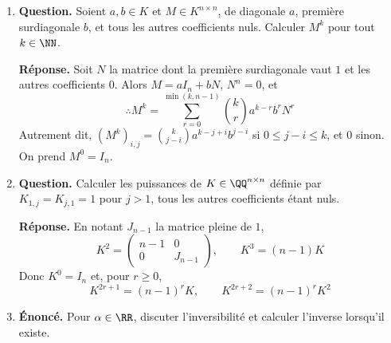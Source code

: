 \documentclass[12pt, a4paper]{article}
\begin{document}
\begin{enumerate}[label=4.\arabic*., start=60]
\begin{minipage}[t]{\linewidth}
\begin{enumerate}[\arabic*.]
  \item \textbf{Question.} Calculer $v_n,w_n$ et $\lim_{n\to\infty}u_n$.
\par\smallskip
\textbf{Réponse.} En appliquant $A^n$ à $(u_0,1)^\top$,
        \[
          v_n=\frac{2(u_0+1)4^n+u_0-2}{3},\qquad
          w_n=\frac{(u_0+1)4^n-u_0+2}{3}
        \]
        Si $u_0=-1$, $u_n=-1$ pour tout $n$ et la limite vaut $-1$.
        Sinon, dès que la suite est définie pour tout $n$, $\lim u_n=2$.
        Les valeurs initiales exclues sont $u_0=-(4^r+2)/(4^r-1)$ pour $r\geq1$ : elles donnent $w_r=0$.

\end{enumerate}
\end{minipage}

  \item \begin{minipage}[t]{\linewidth}\raggedright
\textbf{Question.} Soient $a,b\in K$ et $M\in K^{n\times n}$, de diagonale $a$, première surdiagonale $b$, et tous les autres coefficients nuls. Calculer $M^k$ pour tout $k\in\NN$.
\par\smallskip
\textbf{Réponse.} Soit $N$ la matrice dont la première surdiagonale vaut $1$ et les autres coefficients $0$.
    Alors $M=aI_n+bN$, $N^n=0$, et
    \[
      \therefore M^k=\sum_{r=0}^{\min(k,n-1)}\binom kr a^{k-r}b^rN^r
    \]
    Autrement dit, $(M^k)_{i,j}=\binom{k}{j-i}a^{k-j+i}b^{j-i}$ si $0\leq j-i\leq k$, et $0$ sinon.
    On prend $M^0=I_n$.
\end{minipage}

  \item \begin{minipage}[t]{\linewidth}\raggedright
\textbf{Question.} Calculer les puissances de $K\in\QQ^{n\times n}$ définie par $K_{1,j}=K_{j,1}=1$ pour $j>1$, tous les autres coefficients étant nuls.
\par\smallskip
\textbf{Réponse.} En notant $J_{n-1}$ la matrice pleine de $1$,
    \[
      K^2=\begin{pmatrix}n-1&0\\0&J_{n-1}\end{pmatrix},\qquad K^3=(n-1)K
    \]
    Donc $K^0=I_n$ et, pour $r\geq0$,
    \[
      K^{2r+1}=(n-1)^rK,\qquad K^{2r+2}=(n-1)^rK^2
    \]
\end{minipage}

  \item \begin{minipage}[t]{\linewidth}\raggedright
\textbf{Énoncé.} Pour $\alpha\in\RR$, discuter l’inversibilité et calculer l’inverse lorsqu’il existe.


\end{minipage}
\end{enumerate}
\end{document}
